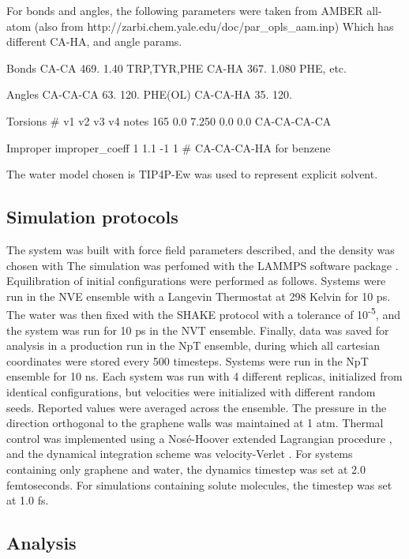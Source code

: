 \documentclass[12pt]{article}
\begin{document}
For bonds and angles, the following parameters were taken from AMBER all-atom
\cite{Weiner1986} (also from http://zarbi.chem.yale.edu/doc/par_opls_aam.inp)
Which has different CA-HA, and angle params.

Bonds
CA-CA 469.       1.40         TRP,TYR,PHE
CA-HA 367.       1.080        PHE, etc. 

Angles
CA-CA-CA    63.        120.     PHE(OL)
CA-CA-HA     35.       120.


Torsions
#      v1        v2        v3       v4         notes
165   0.0       7.250     0.0       0.0        CA-CA-CA-CA                           

Improper
improper_coeff 1 1.1 -1 1  # CA-CA-CA-HA for benzene 

The water model chosen is TIP4P-Ew \cite{Horn2004} was used to represent explicit 
solvent.

\subsection{Simulation protocols}

The system was built with force field parameters described, and the density was
chosen with %
The simulation was perfomed with the LAMMPS software package \cite{Plimpton1995}. 
Equilibration of initial configurations were performed as follows. Systems were run in 
the NVE ensemble with a Langevin Thermostat at 298 Kelvin
for 10 ps. The water was then fixed with the SHAKE protocol \cite{Andersen1983} with a tolerance
of 10\textsuperscript{-5}, and the system was run for 10 ps in the NVT ensemble.
Finally, data was saved for analysis in a production run in the NpT ensemble,
during which all cartesian coordinates were stored every 500 timesteps. 
Systems were run in the NpT ensemble for 10 ns. Each system was run with 4 different 
replicas, initialized from identical configurations, but velocities were initialized with
different random seeds. Reported values were averaged across the ensemble.  The 
pressure in the direction orthogonal to the graphene walls was maintained at 1 atm.
Thermal control was implemented using a Nos\' e-Hoover extended Lagrangian procedure \cite{Martyna1994},
and the dynamical integration scheme was velocity-Verlet \cite{Swope1982}.
For systems containing only graphene and water, the dynamics timestep was set at 2.0 
femtoseconds. For simulations containing solute molecules, the timestep was set
at 1.0 fs. 

\subsection{Analysis}
\end{document}
